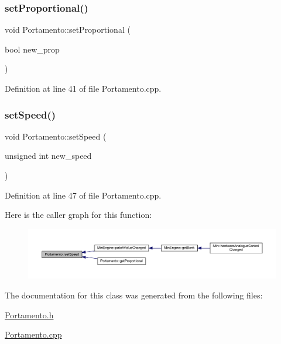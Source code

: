 \subsubsection{\texorpdfstring{set\+Proportional()}{setProportional()}}
{\footnotesize\ttfamily void Portamento\+::set\+Proportional (\begin{DoxyParamCaption}\item[{bool}]{new\+\_\+prop }\end{DoxyParamCaption})}



Definition at line 41 of file Portamento.\+cpp.

\mbox{\label{class_portamento_ac30ccb23ee5bc0dd6bb00215eb9f0805}} 
\subsubsection{\texorpdfstring{set\+Speed()}{setSpeed()}}
{\footnotesize\ttfamily void Portamento\+::set\+Speed (\begin{DoxyParamCaption}\item[{unsigned int}]{new\+\_\+speed }\end{DoxyParamCaption})}



Definition at line 47 of file Portamento.\+cpp.

Here is the caller graph for this function\+:
\nopagebreak
\begin{figure}[H]
\begin{center}
\leavevmode
\includegraphics[width=350pt]{class_portamento_ac30ccb23ee5bc0dd6bb00215eb9f0805_icgraph}
\end{center}
\end{figure}


The documentation for this class was generated from the following files\+:\begin{DoxyCompactItemize}
\item 
\hyperlink{_portamento_8h}{Portamento.\+h}\item 
\hyperlink{_portamento_8cpp}{Portamento.\+cpp}\end{DoxyCompactItemize}
